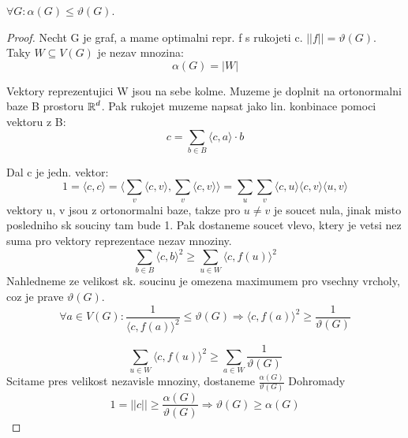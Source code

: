 \begin{lemma}
	$\forall G : \alpha(G) \leq \vartheta(G)$.
\end{lemma}
\begin{proof}
	Necht G je graf, a mame optimalni repr. f s rukojeti c. $|| f || = \vartheta(G)$.
	Taky $W \subseteq V(G)$ je nezav mnozina:
	\[ \alpha(G) = |W| \]

	Vektory reprezentujici W jsou na sebe kolme. Muzeme je doplnit na ortonormalni baze B prostoru $\operatorname{\mathbb{R}}^d$.
	Pak rukojet muzeme napsat jako lin. konbinace pomoci vektoru z B:
	\[ c = \sum_{b \in B} \langle c, a \rangle \cdot b \]

	Dal c je jedn. vektor:
	\[ 1 = \langle c, c \rangle = \langle \sum_v \langle c,v \rangle, \sum_v \langle c,v \rangle \rangle = \sum_u \sum_v \langle c,u \rangle \langle c, v \rangle \langle u, v \rangle \]
	vektory u, v jsou z ortonormalni baze, takze pro $u \ne v$ je soucet nula, jinak misto posledniho sk souciny tam bude 1. Pak dostaneme soucet vlevo, ktery je vetsi nez suma pro vektory reprezentace nezav mnoziny.
	\[ \sum_{b \in B} \langle c, b \rangle^2 \geq \sum_{u \in W} \langle c, f(u) \rangle^2 \]
	Nahledneme ze velikost sk. soucinu je omezena maximumem pro vsechny vrcholy, coz je prave $\vartheta(G)$.
	\[ \forall a \in V(G): \frac{1}{\langle c, f(a) \rangle^2} \leq \vartheta(G) \Rightarrow \langle c, f(a) \rangle^2 \geq \frac{1}{\vartheta(G)} \]

	\[ \sum_{u \in W} \langle c, f(u) \rangle^2 \geq \sum_{a \in W} \frac{1}{\vartheta(G)} \]
	Scitame pres velikost nezavisle mnoziny, dostaneme $ \frac{\alpha(G)}{\vartheta(G)} $
	Dohromady
	\[ 1 = || c || \geq \frac{\alpha(G)}{\vartheta(G)} \Rightarrow \vartheta(G) \geq \alpha(G) \]
\end{proof}

